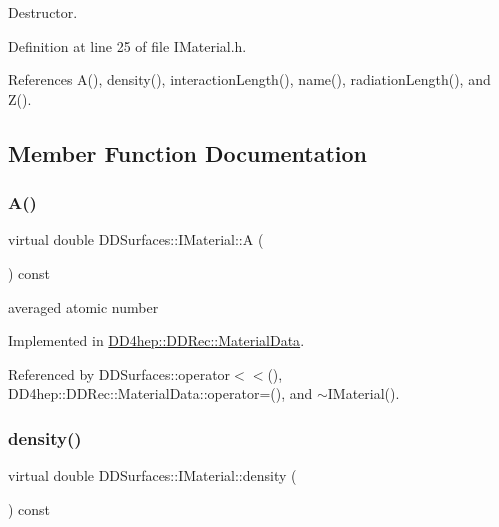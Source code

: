 Destructor. 



Definition at line 25 of file I\+Material.\+h.



References A(), density(), interaction\+Length(), name(), radiation\+Length(), and Z().



\subsection{Member Function Documentation}
\hypertarget{class_d_d_surfaces_1_1_i_material_a02f156030abe09aa3ebe9a4c99b059b2}{}\label{class_d_d_surfaces_1_1_i_material_a02f156030abe09aa3ebe9a4c99b059b2} 
\subsubsection{\texorpdfstring{A()}{A()}}
{\footnotesize\ttfamily virtual double D\+D\+Surfaces\+::\+I\+Material\+::A (\begin{DoxyParamCaption}{ }\end{DoxyParamCaption}) const\hspace{0.3cm}{\ttfamily [pure virtual]}}



averaged atomic number 



Implemented in \hyperlink{class_d_d4hep_1_1_d_d_rec_1_1_material_data_a34cd03ee817287d200cf55fc74cbcb54}{D\+D4hep\+::\+D\+D\+Rec\+::\+Material\+Data}.



Referenced by D\+D\+Surfaces\+::operator$<$$<$(), D\+D4hep\+::\+D\+D\+Rec\+::\+Material\+Data\+::operator=(), and $\sim$\+I\+Material().

\hypertarget{class_d_d_surfaces_1_1_i_material_ac856b9cd5ade3e0ee2720c95af766d25}{}\label{class_d_d_surfaces_1_1_i_material_ac856b9cd5ade3e0ee2720c95af766d25} 
\subsubsection{\texorpdfstring{density()}{density()}}
{\footnotesize\ttfamily virtual double D\+D\+Surfaces\+::\+I\+Material\+::density (\begin{DoxyParamCaption}{ }\end{DoxyParamCaption}) const\hspace{0.3cm}{\ttfamily [pure virtual]}}



